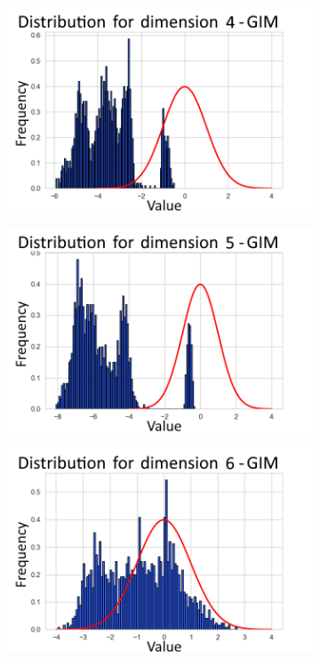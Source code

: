 \begin{figure}[h]
\begin{subfigure}[b]{0.25\textwidth}
	\end{subfigure}
	\hfill
	\begin{subfigure}[b]{0.25\textwidth}
		\centering
		\includegraphics[width=1\linewidth]{"graphs/distr/module2 kld0/_ distribution_latent_space_GIM_dim=3"}
	\end{subfigure}
	\hfill
	\begin{subfigure}[b]{0.25\textwidth}
		\centering
		\includegraphics[width=1\linewidth]{"graphs/distr/module2 kld0/_ distribution_latent_space_GIM_dim=4"}
	\end{subfigure}
	\hfill
	\begin{subfigure}[b]{0.25\textwidth}
		\centering
		\includegraphics[width=1\linewidth]{"graphs/distr/module2 kld0/_ distribution_latent_space_GIM_dim=5"}

\end{subfigure}
\end{figure}
